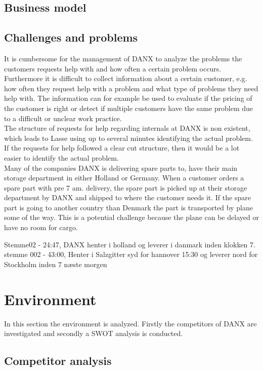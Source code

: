 \subsection{Business model}

\subsection{Challenges and problems}
It is cumbersome for the management of DANX to analyze the problems the customers requests help with and how often a certain problem occurs. Furthermore it is difficult to collect information about a certain customer, e.g. how often they request help with a problem and what type of problems they need help with. The information can for example be used to evaluate if the pricing of the customer is right or detect if multiple customers have the same problem due to a difficult or unclear work practice. \\

The structure of requests for help regarding internals at DANX is non existent, which leads to Lasse using up to several minutes identifying the actual problem. If the requests for help followed a clear cut structure, then it would be a lot easier to identify the actual problem. \\

Many of the companies DANX is delivering spare parts to, have their main storage department in either Holland or Germany. When a customer orders a spare part with pre 7 am. delivery, the spare part is picked up at their storage department by DANX and shipped to where the customer needs it. If the spare part is going to another country than Denmark the part is transported by plane some of the way. This is a potential challenge because the plane can be delayed or have no room for cargo.

Stemme02 - 24:47, DANX henter i holland og leverer i danmark inden klokken 7.
stemme 002 - 43:00, Henter i Salzgitter syd for hannover 15:30 og leverer nord for Stockholm inden 7 næste morgen
	


\section*{Environment}
In this section the environment is analyzed. Firstly the competitors of DANX are investigated and secondly a SWOT analysis is conducted.
	
\subsection{Competitor analysis}
